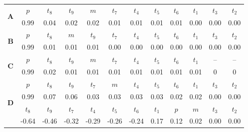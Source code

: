 {\tiny

  {\small
    \begin{table}[!ht]
      \centering
      \begin{tabular}{|c|c|c|c|c|c|c|c|c|c|c|c|}
        \hline
        \multirow{2}{*}{\textbf{A}}   & $p$ & \cellcolor[gray]{0.45} $t_8$ & \cellcolor[gray]{0.50} $t_9$  & $m$ & \cellcolor[gray]{0.65} $t_7$ & \cellcolor[gray]{0.60} $t_4$ & \cellcolor[gray]{0.70} $t_5$ & \cellcolor[gray]{0.75} $t_6$ & \cellcolor[gray]{0.40} $t_1$ & \cellcolor[gray]{0.80} $t_3$ & \cellcolor[gray]{0.55} $t_2$ \\
        & 0.99  & 0.04  & 0.02 & 0.02 & 0.01 & 0.01 & 0.01 & 0.01 & 0.00 & 0.00 & 0.00 \\
        \hline
        \multirow{2}{*}{\textbf{B}}   & $p$ & \cellcolor[gray]{0.45} $t_8$ &  $m$  & \cellcolor[gray]{0.50}$t_9$ & \cellcolor[gray]{0.65} $t_7$ & \cellcolor[gray]{0.60} $t_4$ & \cellcolor[gray]{0.70} $t_5$ & \cellcolor[gray]{0.75} $t_6$ & \cellcolor[gray]{0.40} $t_1$ & \cellcolor[gray]{0.80} $t_3$ & \cellcolor[gray]{0.55} $t_2$ \\
        & 0.99 & 0.01 & 0.01 & 0.01 &  0.00 & 0.00 & 0.00 & 0.00 & 0.00 & 0.00 & 0.00 \\
        \hline
        \multirow{2}{*}{\textbf{C}} & $p$ & \cellcolor[gray]{0.45} $t_8$ & \cellcolor[gray]{0.50} $t_9$ &  $m$ & \cellcolor[gray]{0.65} $t_7$ & \cellcolor[gray]{0.60} $t_4$ & \cellcolor[gray]{0.70} $t_5$ & \cellcolor[gray]{0.75} $t_6$ & \cellcolor[gray]{0.40} $t_1 $ & -- & -- \\
        & 0.99 & 0.02 & 0.01 & 0.01 & 0.01 & 0.01 & 0.01 & 0.01 & 0.01 & 0 & 0 \\
        \hline
        \multirow{4}{*}{\textbf{D}} & $p$ & \cellcolor[gray]{0.45} $t_8$ & \cellcolor[gray]{0.50} $t_9$ &  \cellcolor[gray]{0.65} $t_7$ & $m$ & \cellcolor[gray]{0.60} $t_4$ & \cellcolor[gray]{0.70} $t_5$ & \cellcolor[gray]{0.75} $t_6$ &\cellcolor[gray]{0.40} $t_1$ &\cellcolor[gray]{0.80} $t_3$ & \cellcolor[gray]{0.55} $t_2$ \\
        & 0.99 & 0.07 & 0.06 & 0.03 & 0.03 & 0.03 & 0.03 & 0.02 & 0.02 & 0.00 & 0.00 \\ 
        \cline{2-12}
        & \cellcolor[gray]{0.45} $t_8$ & \cellcolor[gray]{0.50} $t_9$ & \cellcolor[gray]{0.65} $t_7$ &  \cellcolor[gray]{0.60} $t_4$ & \cellcolor[gray]{0.70} $t_5$ & \cellcolor[gray]{0.75} $t_6$ & \cellcolor[gray]{0.40} $t_1$ & $p$ & $m$ & \cellcolor[gray]{0.80} $t_3$ & \cellcolor[gray]{0.55} $t_2$ \\
        & -0.64 & -0.46 & -0.32 & -0.29 & -0.26 & -0.24 & 0.17 & 0.12 & 0.02 & 0.00 & 0.00 \\

\end{tabular}
\end{table}}}
